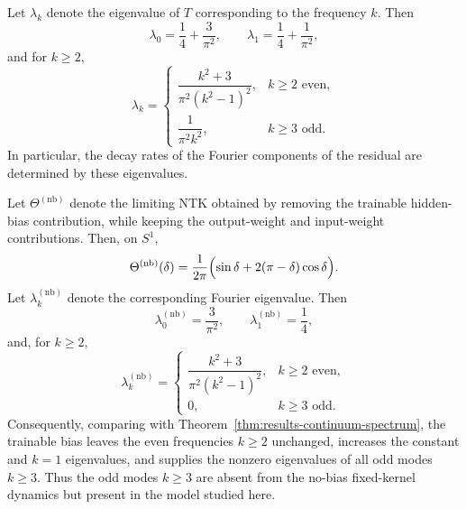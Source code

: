 \begin{theorem}
	\label{thm:results-continuum-spectrum}
	Let \(\lambda_k\) denote the eigenvalue of \(T\) corresponding to the frequency \(k\). Then
	\begin{equation}
		\lambda_0=\frac{1}{4}+\frac{3}{\pi^2},
		\qquad
		\lambda_1=\frac{1}{4}+\frac{1}{\pi^2},
		\label{eq:results-lambda-0-1}
	\end{equation}
	and for \(k\geq 2\),
	\begin{equation}
		\lambda_k=
		\begin{cases}
			\dfrac{k^2+3}{\pi^2(k^2-1)^2}, & k \ge 2 \text{ even}, \\[1em]
			\dfrac{1}{\pi^2 k^2},          & k \ge 3 \text{ odd}.
		\end{cases}
		\label{eq:results-lambda-k}
	\end{equation}
	In particular, the decay rates of the Fourier components of the residual are determined by
	these eigenvalues.
\end{theorem}

\begin{corollary}
	\label{cor:results-bias-spectrum}
	Let \(\Theta^{(\mathrm{nb})}\) denote the limiting NTK obtained by removing the
	trainable hidden-bias contribution, while keeping the output-weight and input-weight
	contributions. Then, on \(S^1\),
	\begin{equation}
		\Theta^{(\mathrm{nb})}(\delta)
		=
		\frac{1}{2\pi}
		\Bigl(
		\sin\delta+2(\pi-\delta)\cos\delta
		\Bigr).
		\label{eq:results-no-bias-kernel}
	\end{equation}
	Let \(\lambda_k^{(\mathrm{nb})}\) denote the corresponding Fourier eigenvalue. Then
	\begin{equation}
		\lambda_0^{(\mathrm{nb})}=\frac{3}{\pi^2},
		\qquad
		\lambda_1^{(\mathrm{nb})}=\frac14,
		\label{eq:results-no-bias-lambda-0-1}
	\end{equation}
	and, for \(k\ge 2\),
	\begin{equation}
		\lambda_k^{(\mathrm{nb})}
		=
		\begin{cases}
			\dfrac{k^2+3}{\pi^2(k^2-1)^2}, & k\ge 2 \text{ even}, \\[1em]
			0,                             & k\ge 3 \text{ odd}.
		\end{cases}
		\label{eq:results-no-bias-lambda-k}
	\end{equation}
	Consequently, comparing with Theorem~\ref{thm:results-continuum-spectrum}, the
	trainable bias leaves the even frequencies \(k\ge 2\) unchanged, increases the constant
	and \(k=1\) eigenvalues, and supplies the nonzero eigenvalues of all odd modes
	\(k\ge 3\). Thus the odd modes \(k\ge 3\) are absent from the no-bias fixed-kernel
	dynamics but present in the model studied here.
\end{corollary}

